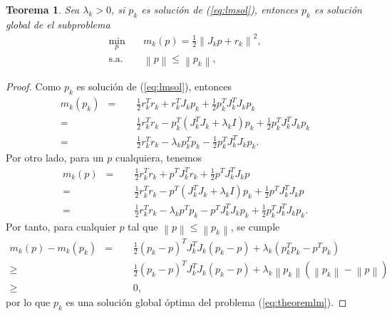 \documentclass[11pt,a4paper]{book}
\newtheorem{theorem}{Teorema}[chapter]
\theoremstyle{definition}
\theoremstyle{remark}
\newcommand{\norm}[1]{\left\lVert#1\right\rVert}
\begin{document}
\begin{theorem}
	Sea $\lambda_k>0$, si $p_k$ es solución de (\ref{eq:lmsol}), entonces $p_k$ es solución global de el subproblema
\begin{equation}
\label{eq:theoremlm}
\begin{aligned}
\min_{p} &\quad m_k(p)=\frac{1}{2} \norm{J_kp+r_k}^2,\\
 \text{s.a.} &\quad \norm{p} \leq \norm{p_k},
\end{aligned}
\end{equation}
\end{theorem}
\begin{proof}
	Como $p_k$ es solución de (\ref{eq:lmsol}), entonces
\begin{equation}
\begin{split}
	m_k(p_k)\enspace
	=&\quad \frac{1}{2}r_k^Tr_k+r_k^TJ_kp_k+\frac{1}{2}p_k^TJ_k^TJ_kp_k \\
	=&\quad \frac{1}{2}r_k^Tr_k-p_k^T(J_k^TJ_k+\lambda_kI)p_k+
										\frac{1}{2}p_k^TJ_k^TJ_kp_k \\
	=&\quad \frac{1}{2}r_k^Tr_k-\lambda_kp_k^Tp_k-
										\frac{1}{2}p_k^TJ_k^TJ_kp_k.
\end{split}
\end{equation}
Por otro lado, para un $p$ cualquiera, tenemos
\begin{equation}
\begin{split}
	m_k(p)\enspace
	=&\quad \frac{1}{2}r_k^Tr_k+p^TJ_k^Tr_k+\frac{1}{2}p^TJ_k^TJ_kp \\
	=&\quad \frac{1}{2}r_k^Tr_k-p^T(J_k^TJ_k+\lambda_kI)p_k+
										\frac{1}{2}p^TJ_k^TJ_kp \\
	=&\quad \frac{1}{2}r_k^Tr_k-\lambda_kp^Tp_k
				-p^TJ_k^TJ_kp_k
										+\frac{1}{2}p_k^TJ_k^TJ_kp_k.
\end{split}
\end{equation}
Por tanto, para cualquier $p$ tal que $\norm{p} \leq \norm{p_k}$, se cumple
\begin{equation}
\begin{split}
	m_k(p) - m_k(p_k) \enspace
	=&\quad\frac{1}{2}(p_k-p)^TJ_k^TJ_k(p_k-p) + \lambda_k(p_k^Tp_k-p^Tp_k) \\
	\geq&\quad \frac{1}{2}(p_k-p)^TJ_k^TJ_k(p_k-p)+
									\lambda_k\norm{p_k}(\norm{p_k}-\norm{p}) \\
	\geq&\quad 0,
\end{split}
\end{equation}
por lo que $p_k$ es una solución global óptima del problema (\ref{eq:theoremlm}).
\end{proof}
\end{document}
